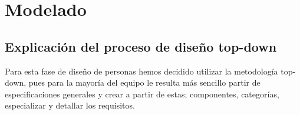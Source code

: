 \documentclass[12pt]{article}
\begin{document}

\section{Modelado}

\subsection{Explicación del proceso de diseño top-down}

Para esta fase de diseño de personas hemos decidido utilizar la metodología top-down, pues para la mayoría del equipo le resulta más sencillo partir de especificaciones generales y crear a partir de estas; componentes, categorías, especializar y detallar los requisitos.
\end{document}
